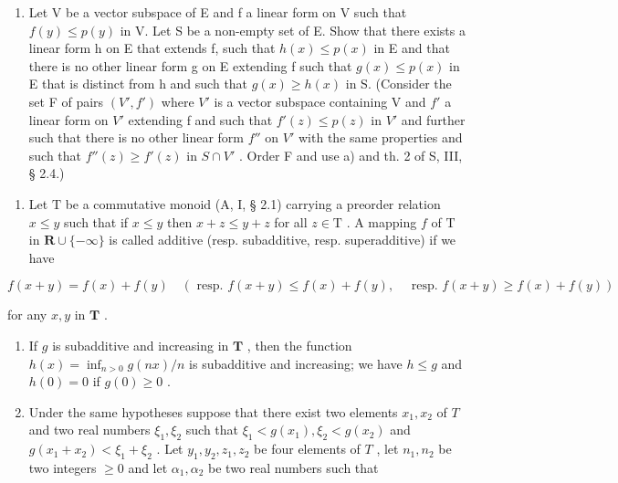 \begin{enumerate}
\def\labelenumi{\alph{enumi})}
\setcounter{enumi}{1}
\tightlist
\item
  Let V be a vector subspace of E and f a linear form on V such that \(f(y) \leqslant p(y)\) in V. Let S be a non-empty set of E. Show that there exists a linear form h on E that extends f, such that \(h(x) \leqslant p(x)\) in E and that there is no other linear form g on E extending f such that \(g(x) \leqslant p(x)\) in E that is distinct from h and such that \(g(x) \geqslant h(x)\) in S. (Consider the set F of pairs \((V', f')\) where \(V'\) is a vector subspace containing V and \(f'\) a linear form on \(V'\) extending f and such that \(f'(z) \leqslant p(z)\) in \(V'\) and further such that there is no other linear form \(f''\) on \(V'\) with the same properties and such that \(f''(z) \geqslant f'(z)\) in \(S \cap V'\) . Order F and use a) and th. 2 of S, III, § 2.4.)
\end{enumerate}

\begin{enumerate}
\def\labelenumi{\arabic{enumi})}
\setcounter{enumi}{6}
\tightlist
\item
  Let \(\mathrm{T}\) be a commutative monoid (A, I, § 2.1) carrying a preorder relation \(x \leqslant y\) such that if \(x \leqslant y\) then \(x + z \leqslant y + z\) for all \(z \in \mathrm{T}\) . A mapping \(f\) of \(\mathrm{T}\) in \(\mathbf{R} \cup \{-\infty\}\) is called additive (resp. subadditive, resp. superadditive) if we have
\end{enumerate}

\[
f (x + y) = f (x) + f (y) \quad (\text { resp. } f (x + y) \leqslant f (x) + f (y), \quad \text { resp. } f (x + y) \geqslant f (x) + f (y))
\]

for any \(x, y\) in \(\mathbf{T}\) .

\begin{enumerate}
\def\labelenumi{\alph{enumi})}
\item
  If \(g\) is subadditive and increasing in \(\mathbf{T}\) , then the function \(h(x) = \inf_{n > 0} g(nx) / n\) is subadditive and increasing; we have \(h \leqslant g\) and \(h(0) = 0\) if \(g(0) \geqslant 0\) .
\item
  Under the same hypotheses suppose that there exist two elements \(x_{1}, x_{2}\) of \(T\) and two real numbers \(\xi_{1}, \xi_{2}\) such that \(\xi_{1} < g(x_{1}), \xi_{2} < g(x_{2})\) and \(g(x_{1} + x_{2}) < \xi_{1} + \xi_{2}\) . Let \(y_{1}, y_{2}, z_{1}, z_{2}\) be four elements of \(T\) , let \(n_{1}, n_{2}\) be two integers \(\geqslant 0\) and let \(\alpha_{1}, \alpha_{2}\) be two real numbers such that
\end{enumerate}

